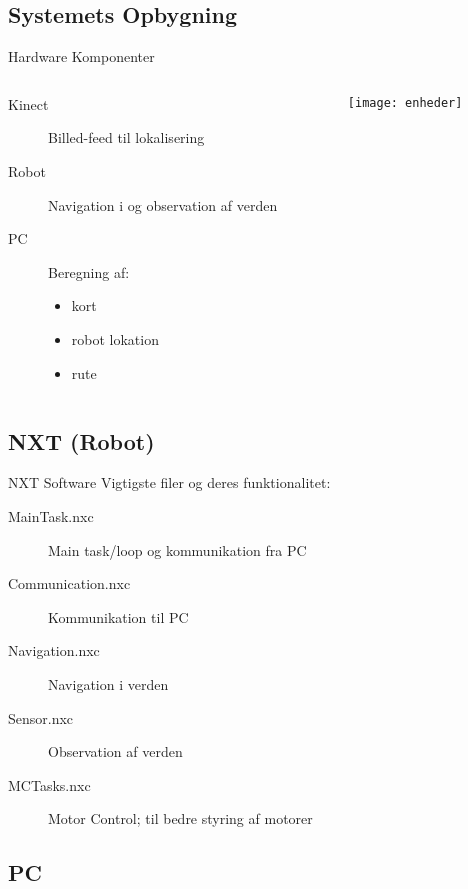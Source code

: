 \subsection{Systemets Opbygning}

\begin{frame}{Hardware Komponenter}
\begin{columns}
\begin{column}{.48\textwidth}
\begin{description}
\item[Kinect]{Billed-feed til lokalisering}
\item[Robot]{Navigation i og observation af verden}
\item[PC]{Beregning af:}
\begin{itemize}
\item{kort}
\item{robot lokation}
\item{rute}
\end{itemize}
\end{description}
\end{column}
\begin{column}{.48\textwidth}
\texttt{[image: enheder]}
\end{column}
\end{columns}
\end{frame}

\subsection{NXT (Robot)}

\begin{frame}{NXT Software}
Vigtigste filer og deres funktionalitet:
\begin{description}
\item[MainTask.nxc]{Main task/loop og kommunikation fra PC}
\item[Communication.nxc]{Kommunikation til PC}
\item[Navigation.nxc]{Navigation i verden}
\item[Sensor.nxc]{Observation af verden}
\item[MCTasks.nxc]{Motor Control; til bedre styring af motorer}
\end{description}
\end{frame}

\subsection{PC}

